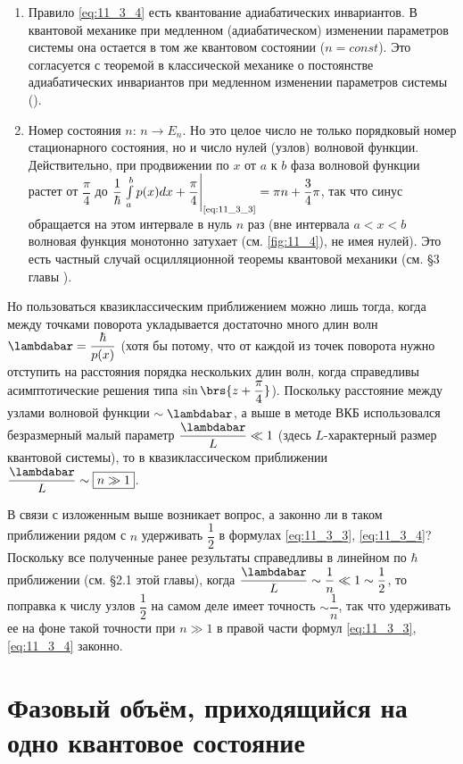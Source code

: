 \begin{enumerate}
\item Правило \eqref{eq:11_3_4} есть квантование адиабатических инвариантов. В квантовой механике при медленном (адиабатическом) изменении параметров системы она остается в том же квантовом состоянии ($n = const$). Это согласуется с теоремой в классической механике о постоянстве адиабатических инвариантов при медленном изменении параметров системы ().

\item Номер состояния $n$: $n \to E_n$. Но это целое число не только порядковый номер стационарного состояния, но и число нулей (узлов) волновой функции. Действительно, при продвижении по $x$ от $a$ к $b$ фаза волновой функции растет от $\dfrac{\pi}{4}$ до $\dfrac{1}{\hbar} \left. \int \limits_{a}^{b} p(x)dx + \dfrac{\pi}{4} \right|_{\text{\eqref{eq:11_3_3}}} =\pi n + \dfrac{3}{4}\pi$, так что синус обращается на этом интервале в нуль $n$ раз (вне интервала $a < x < b$ волновая функция монотонно затухает (см. \autoref{fig:11_4}), не имея нулей). Это есть частный случай осцилляционной теоремы квантовой механики (см. \S 3 главы ).
\end{enumerate}

Но пользоваться квазиклассическим приближением можно лишь тогда, когда между точками поворота укладывается достаточно много длин волн $\lambdabar = \dfrac{\hbar}{p(x)}$ (хотя бы потому, что от каждой из точек поворота нужно отступить на расстояния порядка нескольких длин волн, когда справедливы асимптотические решения типа $\sin \brs{z + \dfrac{\pi}{4}}$). Поскольку расстояние между узлами волновой функции $\sim \lambdabar$, а выше в методе ВКБ использовался безразмерный малый параметр $\dfrac{\lambdabar}{L} \ll 1$ (здесь $L$-характерный размер квантовой системы), то в квазиклассическом приближении $\dfrac{\lambdabar}{L} \sim \boxed{n \gg 1}$.

В связи с изложенным выше возникает вопрос, а законно ли в таком приближении рядом с $n$ удерживать $\dfrac{1}{2}$ в формулах \eqref{eq:11_3_3}, \eqref{eq:11_3_4}? Поскольку все полученные ранее результаты справедливы в линейном по $\hbar$ приближении (см. \S {2.1} этой главы), когда $\dfrac{\lambdabar}{L} \sim \dfrac{1}{n} \ll 1 \sim \dfrac{1}{2}$, то поправка к числу узлов $\dfrac{1}{2}$ на самом деле имеет точность $\sim \dfrac{1}{n}$, так что удерживать ее на фоне такой точности при $n \gg 1$ в правой части формул \eqref{eq:11_3_3}, \eqref{eq:11_3_4} законно.

\section{Фазовый объём, приходящийся на одно квантовое состояние}


